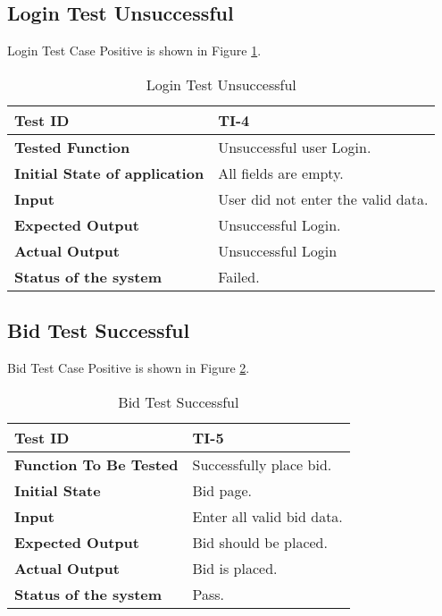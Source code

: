 \subsection{Login Test Unsuccessful}
Login Test Case Positive is shown in Figure \ref{tt4}.
\begin{table}[!h]
    \centering
    \begin{tabular}{|p{5cm}|p{8cm}|}
         \textbf{Test ID} & \textbf{TI-4}\\
        \hline
        \textbf{Tested Function} & Unsuccessful user Login. \\
        \hline
        \textbf{Initial State of application} & All fields are empty.\\
        \hline
        \textbf{Input} & User did not enter the valid data.\\
        \hline
        \textbf{Expected Output} & Unsuccessful Login.\\
        \hline
        \textbf{Actual Output} & Unsuccessful Login\\
        \hline
         \textbf{Status of the system} & Failed.\\
         \hline
    \end{tabular}
    \caption{Login Test Unsuccessful}
    \label{tt4}
\end{table}
\newpage
\subsection{Bid Test Successful}
Bid Test Case Positive is shown in Figure \ref{tt5}.
\begin{table}[!h]
    \centering
    \begin{tabular}{|p{5cm}|p{8cm}|}
        \hline
        \textbf{Test ID} & \textbf{TI-5}\\
        \hline
        \textbf{Function To Be Tested} & Successfully place bid. \\
        \hline
        \textbf{Initial State} & Bid page.\\
        \hline
        \textbf{Input} & Enter all valid bid data.\\
        \hline
        \textbf{Expected Output} & Bid should be placed.\\
        \hline
        \textbf{Actual Output} & Bid is placed.\\
         \hline
         \textbf{Status of the system} & Pass.\\
         \hline
    \end{tabular}
    \caption{Bid Test Successful}
    \label{tt5}
\end{table}

